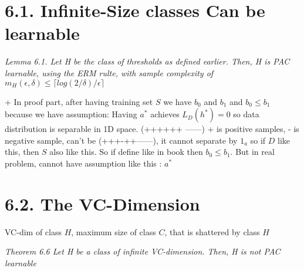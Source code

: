 \section{6.1. Infinite-Size classes Can be learnable}

\textit{Lemma 6.1. Let H be the class of thresholds as defined earlier. Then, H is PAC learnable, using the ERM rulte, with sample complexity of $m_H(\epsilon, \delta) \leq \lceil log(2/\delta)/ \epsilon \rceil$}

+ In proof part, after having training set $S$ we have $b_0$ and $b_1$ and $b_0 \leq b_1$ because we have assumption: Having $a^{*}$ achieves $L_D(h^*) = 0$ so data distribution is separable in 1D space. (++++++ ------) + is positive samples, - is negative sample, can't be (+++-++------), it cannot separate by $1_{a}$ so if $D$ like this, then $S$ also like this. So if define like in book then $b_0 \leq b_1$. But in real problem, cannot have assumption like this : $a^*$

\section{6.2. The VC-Dimension}
VC-dim of class $H$, maximum size of class $C$, that is shattered by class $H$

\textit{Theorem 6.6 Let H be a class of infinite VC-dimension. Then, H is not PAC learnable}
